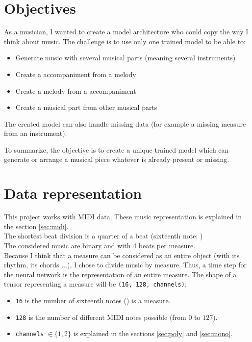 \documentclass[12pt]{report}
\begin{document}
\section{Objectives}
\label{sec:objectives}

As a musician, I wanted to create a model architecture who could copy the way I think about music.
The challenge is to use only one trained model to be able to:
\begin{itemize}
    \item Generate music with several musical parts (meaning several instruments)
    \item Create a accompaniment from a melody
    \item Create a melody from a accompaniment
    \item Create a musical part from other musical parts
\end{itemize}
The created model can also handle missing data (for example a missing measure from an instrument).

To summarize, the objective is to create a unique trained model which can generate or arrange a musical piece whatever is already present or missing.

\section{Data representation}
\label{sec:data_represetation}

This project works with MIDI data. These music representation is explained in the section \ref{sec:midi}. \\
The shortest beat division is a quarter of a beat (sixteenth note: \musSixteenth) \\
The considered music are binary and with 4 beats per measure. \\
Because I think that a measure can be considered as an entire object (with its rhythm, its chords ...), I chose to divide music by measure. Thus, a time step for the neural network is the representation of an entire measure.
The shape of a tensor representing a measure will be \texttt{(16, 128, channels)}:
\begin{itemize}
    \item \texttt{16} is the number of sixteenth notes (\musSixteenth) is a measure.
    \item \texttt{128} is the number of different MIDI notes possible (from $0$ to $127$).
    \item \texttt{channels} $\in \{1, 2\}$ is explained in the sections \ref{sec:poly} and \ref{sec:mono}.
\end{itemize}
\end{document}
